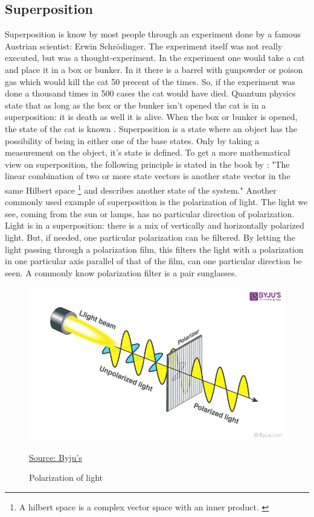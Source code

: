 \subsection{Superposition} \label{superposition}
Superposition is know by most people through an experiment done by a famous Austrian scientist: Erwin Schrödinger.
The experiment itself was not really executed, but was a thought-experiment. In the experiment one would take a cat and place it in a box or bunker. 
In it there is a barrel with gunpowder or poison gas which would kill the cat 50 precent of the times. So, if the experiment was done a thousand times in 500 cases the cat would have died.
Quantum physics state that as long as the box or the bunker isn't opened the cat is in a superposition: it is death as well it is alive.
When the box or bunker is opened, the state of the cat is known \autocite{Villars_1986}.
Superposition is a state where an object has the possibility of being in either one of the base states. Only by taking a measurement on the object, it's state is defined.
To get a more mathematical view on superposition, the following principle is stated in the book by \textcite{Hidary_2019}:
"The linear combination of two or more state vectors is another state vector in the same Hilbert space \footnote{A hilbert space is a complex vector space with an inner product. \autocite{Griffiths2014}} and describes another state of the system."
Another commonly used example of superposition is the polarization of light. The light we see, coming from the sun or lamps, has no particular direction of polarization.
Light is in a superposition: there is a mix of vertically and horizontally polarized light. But, if needed, one particular polarization can be filtered.
By letting the light passing through a polarization film, this filters the light with a polarization in one particular axis parallel of that of the film, can one particular direction be seen.
A commonly know polarization filter is a pair sunglasses.

\begin{figure} [h]
    \centering
    \includegraphics[width=\textwidth]{img/Polarization-of-Light-2.png}
        \caption{Polarization of light}
        \label{fig:polarization}
    \href{https://byjus.com/physics/polarization-of-light/}{Source: Byju's}

\end{figure}


